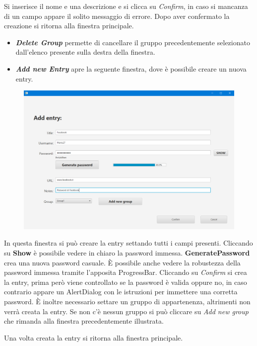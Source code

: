 \documentclass[a4paper,12pt]{report}
\begin{document}
Si inserisce il nome e una descrizione e si clicca su \textit{Confirm}, in caso si mancanza di un campo appare il solito messaggio di errore. Dopo aver confermato la creazione si ritorna alla finestra principale.

\begin{itemize}
    \item \textbf{\textit{Delete Group}} permette di cancellare il gruppo precedentemente selezionato dall’elenco presente sulla destra della finestra.
    \item \textbf{\textit{Add new Entry}} apre la seguente finestra, dove è possibile creare un nuova entry.
\end{itemize}

\clearpage
\begin{figure}[h]
\centering{}
\includegraphics[width=\textwidth]{user-manual/8}
\end{figure}

In questa finestra si può creare la entry settando tutti i campi presenti. Cliccando su \textbf{Show} è possibile vedere in chiaro la password immessa. \textbf{GeneratePassword} crea una nuova password casuale. È possibile anche vedere la robustezza della password immessa tramite l’apposita ProgressBar.
Cliccando su \textit{Confirm} si crea la entry, prima però viene controllato se la password è valida oppure no, in caso contrario appare un AlertDialog con le istruzioni per immettere una corretta password. È inoltre necessario settare un gruppo di appartenenza, altrimenti non verrà creata la entry. Se non c’è nessun gruppo si può cliccare su \textit{Add new group} che rimanda alla finestra precedentemente illustrata.

Una volta creata la entry si ritorna alla finestra principale.
\end{document}
